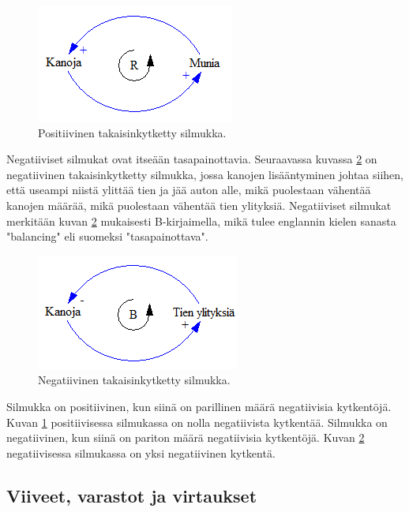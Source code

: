 \documentclass[finnish,12pt,a4paper,pdftex]{article}
\begin{document}
\begin{onehalfspacing}
\begin{figure}[H]
\centering \includegraphics{positiivinen}
\caption{Positiivinen takaisinkytketty silmukka. \cite[s. 13]{Sterman2000} \label{sysdyn:positiivinen}}
\end{figure}

Negatiiviset silmukat ovat itseään tasapainottavia. Seuraavassa kuvassa \ref{sysdyn:negatiivinen} on negatiivinen takaisinkytketty silmukka, jossa kanojen lisääntyminen johtaa siihen, että useampi niistä ylittää tien ja jää auton alle, mikä puolestaan vähentää kanojen määrää, mikä puolestaan vähentää tien ylityksiä. Negatiiviset silmukat merkitään kuvan \ref{sysdyn:negatiivinen} mukaisesti B-kirjaimella, mikä tulee englannin kielen sanasta "balancing" eli suomeksi "tasapainottava". \cite[s. 12--14]{Sterman2000}

\begin{figure}[H]
\centering \includegraphics{negatiivinen}
\caption{Negatiivinen takaisinkytketty silmukka. \cite[s. 13]{Sterman2000} \label{sysdyn:negatiivinen}}
\end{figure}

Silmukka on positiivinen, kun siinä on parillinen määrä negatiivisia kytkentöjä. Kuvan \ref{sysdyn:positiivinen} positiivisessa silmukassa on nolla negatiivista kytkentää. Silmukka on negatiivinen, kun siinä on pariton määrä negatiivisia kytkentöjä. Kuvan \ref{sysdyn:negatiivinen} negatiivisessa silmukassa on yksi negatiivinen kytkentä. \cite[s. 12--14]{Sterman2000}

\subsection{Viiveet, varastot ja virtaukset \label{sysdyn:vvv}}


\end{onehalfspacing}
\end{document}
